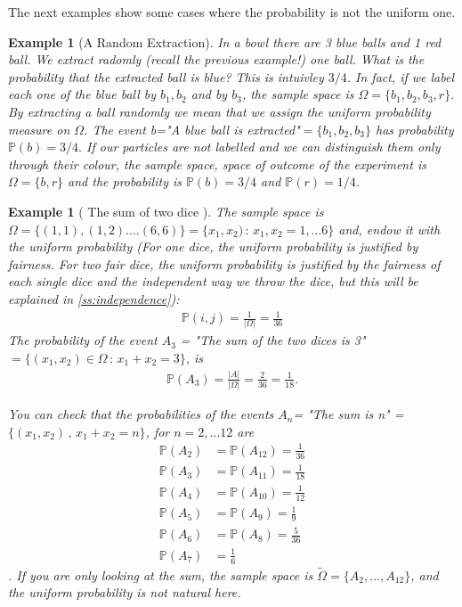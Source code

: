 \documentclass[12pt]{article}
\newtheorem{example}[theorem]{Example}
\newcommand{\<}{{\langle \!\! \langle}}
\renewcommand{\>}{{\rangle \!\! \rangle}}
\newcommand{\bel}[2]{\begin{equation} \label{#1} \begin{split} #2
 					\end{split} \end{equation}}
\begin{document}
The next examples show some  cases where the probability is not the uniform one. 
\begin{example}[A Random Extraction]
	In a bowl there are 3 blue balls and 1 red ball. We extract radomly (recall the previous example!) one ball. What is the probability that the extracted ball is blue? This is intuivley $3/4$. In fact, if we label each one of the blue ball by $b_1, b_2$ and by $b_3$, the sample space is $\Omega=\{b_1,b_2,b_3, r\}.$ By extracting a ball randomly we mean that we  assign the uniform probability measure on $\Omega$. The event b="A blue ball is extracted"$=\{b_1,b_2,b_3\}$ has probability $\mathbb{P}(b)=3/4.$
	If our particles are not labelled and we can distinguish them only through their colour, the sample space, space of outcome of the experiment is $\Omega=\{b,r\}$ and the probability is $\mathbb{P}(b)=3/4$ and $\mathbb{P}(r)=1/4$. 
\end{example}


\begin{example}[ The sum of two dice ] The sample space is $\Omega=\{(1,1),(1,2)....(6,6)\}=\{x_1,x_2)\,:\, x_1,x_2=1,...6\}$ and, endow it with the uniform probability (For one dice, the uniform probability is justified by fairness. For two fair dice, the uniform probability is justified by the fairness of each single dice and the independent way we throw the dice, but this will be explained in \ref{ss:independence}):
\bel{dice}{\mathbb{P}(i,j)=\frac{1}{|\Omega|}=\frac{1}{36}}
The probability of the event $A_3$ = "The sum of the two dices is 3" $= \{(x_1,x_2)\in\Omega\,:\,x_1+x_2=3\}$, is 
\bel{a3}{\mathbb{P}(A_3)=\frac{|A|}{|\Omega|}=\frac{2}{36}=\frac{1}{18}.}


You can check that the probabilities of the events $A_n $= "The sum is n" = $\{(x_1,x_2)\,,\,x_1+x_2 = n\}$, for $n=2,...12$ are
\bel{sum}{
\mathbb{P}(A_2) &=\mathbb{P}(A_{12})=\frac{1}{36}\\
\mathbb{P}(A_3) &=\mathbb{P}(A_{11})= \frac{1}{18}\\
\mathbb{P}(A_4) &=\mathbb{P}(A_{10})= \frac{1}{12}\\
\mathbb{P}(A_5) &=\mathbb{P}(A_9)= \frac{1}{9}\\
\mathbb{P}(A_6) &=\mathbb{P}(A_8)= \frac{5}{36}\\
\mathbb{P}(A_7) &=\frac{1}{6}}.
If you are only looking at the sum, the sample space is $\tilde{\Omega}=\{A_2,...,A_12\}$, and the uniform probability is not natural here.
\end{example}
\end{document}
